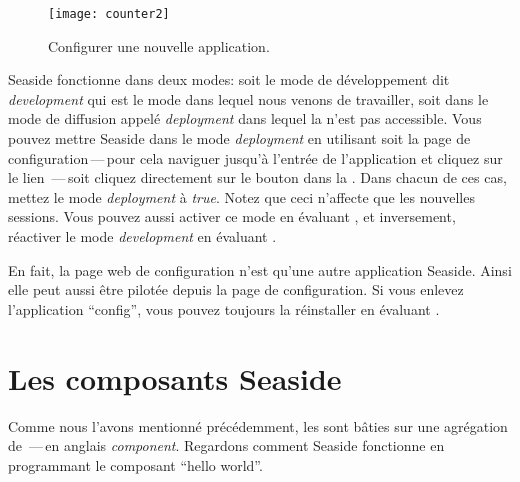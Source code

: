 \documentclass[a4paper,10pt,twoside]{book}
\begin{document}
\begin{figure}[ht]
\begin{center}
\texttt{[image: counter2]}
\caption{Configurer une nouvelle application.}
\end{center}
\end{figure}

Seaside fonctionne dans deux modes: soit le mode de développement dit 
\emph{development} qui est le mode dans lequel nous venons de travailler,
soit dans le mode de diffusion appelé \emph{deployment} dans lequel la
\toolbar n'est pas accessible. 
Vous pouvez mettre Seaside dans le mode \emph{deployment} en utilisant
soit la page de configuration\,---\,pour cela naviguer jusqu'à
l'entrée de l'application et cliquez sur le lien \,---\,soit
cliquez directement sur le bouton   dans la
\toolbar.
Dans chacun de ces cas, mettez le mode \emph{deployment} à
\emph{true}.
Notez que ceci n'affecte que les nouvelles sessions.
Vous pouvez aussi activer ce mode en évaluant 
 , et
inversement, réactiver le mode \emph{development} en évaluant
.

En fait, la page web de configuration n'est qu'une autre application
Seaside. Ainsi elle peut aussi être pilotée depuis la page de
configuration. Si vous enlevez l'application
``config'', vous pouvez toujours la réinstaller en évaluant
 .

\section{Les composants Seaside}


Comme nous l'avons mentionné précédemment, les  sont bâties sur une agrégation de
  \,---\,en anglais \emph{component}.
Regardons comment Seaside fonctionne en programmant le composant
``hello world''.
\end{document}
